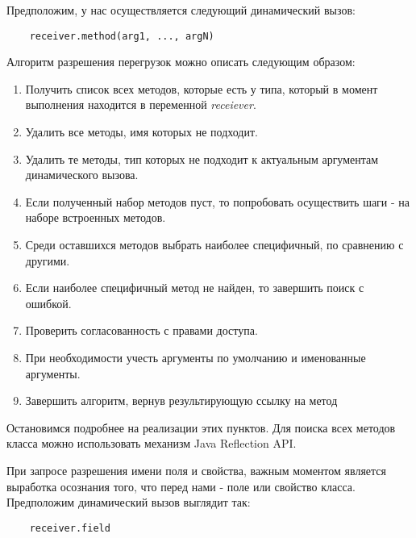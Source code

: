 Предположим, у нас осуществляется следующий динамический вызов:

\begin{verbatim}
    receiver.method(arg1, ..., argN)
\end{verbatim}

Алгоритм разрешения перегрузок можно описать следующим образом:

\begin{enumerate}
    \item Получить список всех методов, которые есть у типа, который в момент выполнения находится в переменной \textit{receiever}.
    \item Удалить все методы, имя которых не подходит.\label{itm:del1}
    \item Удалить те методы, тип которых не подходит к актуальным аргументам динамического вызова.\label{itm:del2}
    \item Если полученный набор методов пуст, то попробовать осуществить шаги \label{itm:del1}-\label{itm:del2} на наборе встроенных методов.
    \item Среди оставшихся методов выбрать наиболее специфичный, по сравнению с другими.
    \item Если наиболее специфичный метод не найден, то завершить поиск с ошибкой.
    \item Проверить согласованность с правами доступа.
    \item При необходимости учесть аргументы по умолчанию и именованные аргументы.
    \item Завершить алгоритм, вернув результирующую ссылку на метод
\end{enumerate}

Остановимся подробнее на реализации этих пунктов. Для поиска всех методов класса можно использовать механизм Java Reflection API.


При запросе разрешения имени поля и свойства, важным моментом является выработка осознания того, что перед нами - поле или свойство класса. Предположим динамический вызов выглядит так:

\begin{verbatim}
    receiver.field
\end{verbatim}

